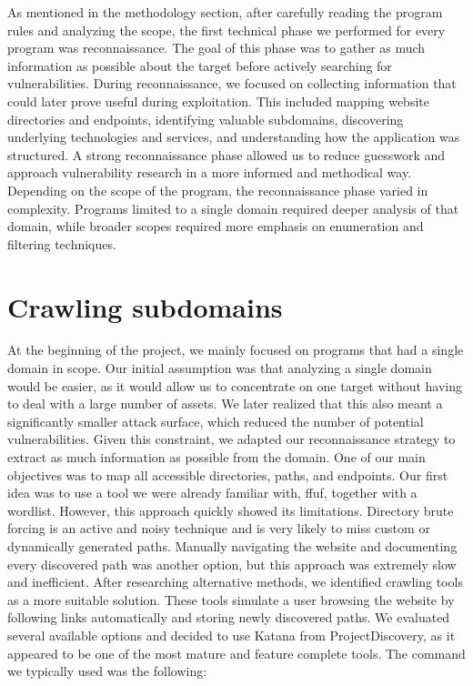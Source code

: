 \documentclass[12pt,a4paper]{report}
\begin{document}
As mentioned in the methodology section, after carefully reading the program rules and analyzing the scope, the first technical phase we performed for every program was reconnaissance. The goal of this phase was to gather as much information as possible about the target before actively searching for vulnerabilities.
During reconnaissance, we focused on collecting information that could later prove useful during exploitation. This included mapping website directories and endpoints, identifying valuable subdomains, discovering underlying technologies and services, and understanding how the application was structured. A strong reconnaissance phase allowed us to reduce guesswork and approach vulnerability research in a more informed and methodical way.
Depending on the scope of the program, the reconnaissance phase varied in complexity. Programs limited to a single domain required deeper analysis of that domain, while broader scopes required more emphasis on enumeration and filtering techniques.

\section{Crawling subdomains}

At the beginning of the project, we mainly focused on programs that had a single domain in scope. Our initial assumption was that analyzing a single domain would be easier, as it would allow us to concentrate on one target without having to deal with a large number of assets. We later realized that this also meant a significantly smaller attack surface, which reduced the number of potential vulnerabilities.
Given this constraint, we adapted our reconnaissance strategy to extract as much information as possible from the domain. One of our main objectives was to map all accessible directories, paths, and endpoints. Our first idea was to use a tool we were already familiar with, ffuf, together with a wordlist. However, this approach quickly showed its limitations. Directory brute forcing is an active and noisy technique and is very likely to miss custom or dynamically generated paths.
Manually navigating the website and documenting every discovered path was another option, but this approach was extremely slow and inefficient. After researching alternative methods, we identified crawling tools as a more suitable solution. These tools simulate a user browsing the website by following links automatically and storing newly discovered paths.
We evaluated several available options and decided to use Katana from ProjectDiscovery, as it appeared to be one of the most mature and feature complete tools. The command we typically used was the following:
\end{document}
